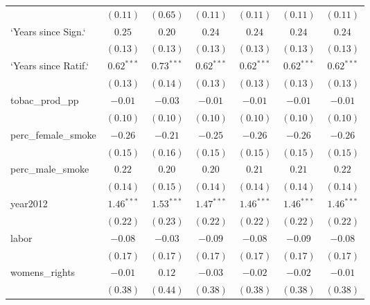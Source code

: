 \begin{table}[!h]
\begin{center}
\begin{tabular}{l c c c c c c }
                        & $(0.11)$     & $(0.65)$     & $(0.11)$     & $(0.11)$     & $(0.11)$     & $(0.11)$     \\
`Years since Sign.`     & $0.25$       & $0.20$       & $0.24$       & $0.24$       & $0.24$       & $0.24$       \\
                        & $(0.13)$     & $(0.13)$     & $(0.13)$     & $(0.13)$     & $(0.13)$     & $(0.13)$     \\
`Years since Ratif.`    & $0.62^{***}$ & $0.73^{***}$ & $0.62^{***}$ & $0.62^{***}$ & $0.62^{***}$ & $0.62^{***}$ \\
                        & $(0.13)$     & $(0.14)$     & $(0.13)$     & $(0.13)$     & $(0.13)$     & $(0.13)$     \\
tobac\_prod\_pp         & $-0.01$      & $-0.03$      & $-0.01$      & $-0.01$      & $-0.01$      & $-0.01$      \\
                        & $(0.10)$     & $(0.10)$     & $(0.10)$     & $(0.10)$     & $(0.10)$     & $(0.10)$     \\
perc\_female\_smoke     & $-0.26$      & $-0.21$      & $-0.25$      & $-0.26$      & $-0.26$      & $-0.26$      \\
                        & $(0.15)$     & $(0.16)$     & $(0.15)$     & $(0.15)$     & $(0.15)$     & $(0.15)$     \\
perc\_male\_smoke       & $0.22$       & $0.20$       & $0.20$       & $0.21$       & $0.21$       & $0.22$       \\
                        & $(0.14)$     & $(0.15)$     & $(0.14)$     & $(0.14)$     & $(0.14)$     & $(0.14)$     \\
year2012                & $1.46^{***}$ & $1.53^{***}$ & $1.47^{***}$ & $1.46^{***}$ & $1.46^{***}$ & $1.46^{***}$ \\
                        & $(0.22)$     & $(0.23)$     & $(0.22)$     & $(0.22)$     & $(0.22)$     & $(0.22)$     \\
labor                   & $-0.08$      & $-0.03$      & $-0.09$      & $-0.08$      & $-0.09$      & $-0.08$      \\
                        & $(0.17)$     & $(0.17)$     & $(0.17)$     & $(0.17)$     & $(0.17)$     & $(0.17)$     \\
womens\_rights          & $-0.01$      & $0.12$       & $-0.03$      & $-0.02$      & $-0.02$      & $-0.01$      \\
                        & $(0.38)$     & $(0.44)$     & $(0.38)$     & $(0.38)$     & $(0.38)$     & $(0.38)$     \\

\end{tabular}
\end{center}
\end{table}
